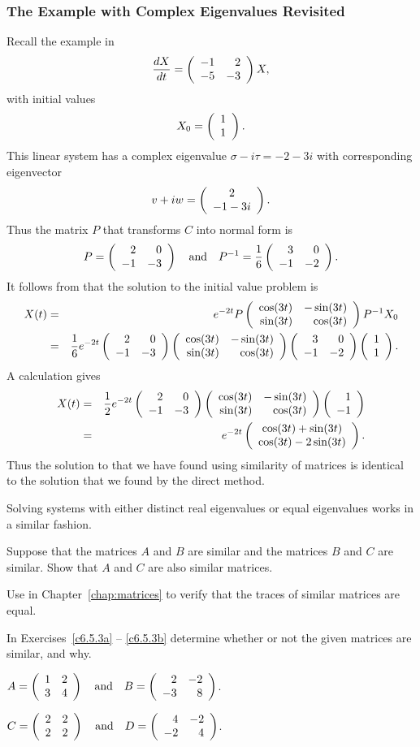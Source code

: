 \subsubsection*{The Example with Complex Eigenvalues Revisited}

Recall the example in 
\[
\frac{dX}{dt} = \left(\begin{array}{rr} -1 & 2\\ -5 &-3\end{array}\right) X,
\]
with initial values
\[
X_0=\left(\begin{array}{r} 1 \\ 1\end{array}\right).
\]
This linear system has a complex eigenvalue $\sigma-i\tau=-2-3i$ with
corresponding eigenvector
\[
v+iw = \left(\begin{array}{c} 2 \\ -1-3i\end{array}\right).
\]
Thus the matrix $P$ that transforms $C$ into normal form is
\[
P = \left(\begin{array}{rr} 2 & 0\\ -1 &-3\end{array}\right) \quad\mbox{and}\quad P^{-1} = \frac{1}{6}\left(\begin{array}{rr} 3 & 0\\ -1 &-2\end{array}\right).
\]
It follows from  that the solution to the initial value problem
is
\begin{eqnarray*}
X(t) & =  &
e^{-2t}P\left(\begin{array}{rr} \cos(3t) & -\sin(3t)\\ \sin(3t) &\cos(3t)\end{array}\right)P^{-1} X_0 \\ & = &
\frac{1}{6}e^{-2t}\left(\begin{array}{rr} 2 & 0\\ -1 &-3\end{array}\right)
\left(\begin{array}{rr} \cos(3t) & -\sin(3t)\\ \sin(3t) &\cos(3t)\end{array}\right)
\left(\begin{array}{rr} 3 & 0\\ -1 &-2\end{array}\right)\left(\begin{array}{r} 1 \\ 1\end{array}\right).
\end{eqnarray*}
A calculation gives
\begin{eqnarray*}
X(t) & = & \frac{1}{2}e^{-2t}\left(\begin{array}{rr} 2 & 0\\ -1 &-3\end{array}\right)
\left(\begin{array}{rr} \cos(3t) & -\sin(3t)\\ \sin(3t) &\cos(3t)\end{array}\right)\left(\begin{array}{r} 1 \\ -1\end{array}\right)  \\
& = & e^{-2t}
\left(\begin{array}{c} \cos(3t)+\sin(3t) \\ \cos(3t)-2\sin(3t)\end{array}\right).
\end{eqnarray*}
Thus the solution to  that we have found using 
similarity of matrices is identical to the solution 
that we found by the direct method.

Solving systems with either distinct real eigenvalues or equal eigenvalues
works in a similar fashion.



\EXER

\TEXER

\begin{exercise} \label{c6.5.1}
Suppose that the matrices $A$ and $B$ are similar and the matrices
$B$ and $C$ are similar.  Show that $A$ and $C$ are also similar
matrices.
\end{exercise}

\begin{exercise} \label{c6.5.2}
Use  in Chapter~\ref{chap:matrices} to verify that the
traces of similar matrices are equal.
\end{exercise}

\noindent In Exercises~\ref{c6.5.3a} -- \ref{c6.5.3b} determine whether
or not the given matrices are similar, and why.
\begin{exercise} \label{c6.5.3a}
$A = \left(\begin{array}{rr} 1 & 2\\ 3 &4\end{array}\right) \quad\mbox{and}\quad B = \left(\begin{array}{rr} 2 & -2\\ -3 &8\end{array}\right)$.
\end{exercise}
\begin{exercise} \label{c6.5.3b}
$C = \left(\begin{array}{rr} 2 & 2\\ 2 &2\end{array}\right) \quad\mbox{and}\quad D = \left(\begin{array}{rr} 4 & -2\\ -2 &4\end{array}\right)$.
\end{exercise}

